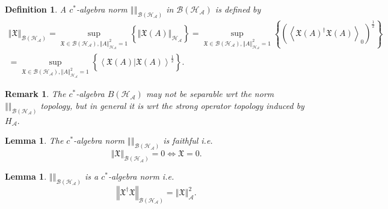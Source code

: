 \documentclass[aps,preprint]{revtex4}%
\newtheorem{definition}[theorem]{Definition}
\newtheorem{lemma}[theorem]{Lemma}
\newtheorem{remark}[theorem]{Remark}
\begin{document}
\begin{definition}
A $c^{\ast}$-algebra norm $\left\Vert {}\right\Vert _{\mathcal{B}\left(
\mathcal{H}_{\mathcal{A}}\right)  }$ in $\mathcal{B}\left(  \mathcal{H}%
_{\mathcal{A}}\right)  $ is defined by
\begin{gather}
\left\Vert \mathfrak{X}\right\Vert _{\mathcal{B}\left(  \mathcal{H}%
_{\mathcal{A}}\right)  }=\sup\limits_{\mathfrak{X}\in\mathcal{B}\left(
\mathcal{H}_{\mathcal{A}}\right)  ,\left\Vert A\right\Vert _{\mathcal{H}%
_{\mathcal{A}}}^{2}=1}\left\{  \left\Vert \mathfrak{X}\left(  A\right)
\right\Vert _{\mathcal{H}_{\mathcal{A}}}\right\}  =\sup\limits_{\mathfrak{X}%
\in\mathcal{B}\left(  \mathcal{H}_{\mathcal{A}}\right)  ,\left\Vert
A\right\Vert _{\mathcal{H}_{\mathcal{A}}}^{2}=1}\left\{  \left(  \left\langle
\mathfrak{X}\left(  A\right)  ^{\dagger}\mathfrak{X}\left(  A\right)
\right\rangle _{0}\right)  ^{\frac{1}{2}}\right\} \\
=\sup\limits_{\mathfrak{X}\in\mathcal{B}\left(  \mathcal{H}_{\mathcal{A}%
}\right)  ,\left\Vert A\right\Vert _{\mathcal{H}_{\mathcal{A}}}^{2}=1}\left\{
\left\langle \left.  \mathfrak{X}\left(  A\right)  \right\vert \mathfrak{X}%
\left(  A\right)  \right\rangle ^{\frac{1}{2}}\right\}  .
\end{gather}

\end{definition}

\begin{remark}
\emph{The }$c^{\ast}$\emph{-algebra }$B\left(  \mathcal{H}_{\mathcal{A}%
}\right)  $\emph{ may not be separable wrt the norm }$\left\Vert {}\right\Vert
_{\mathcal{B}\left(  \mathcal{H}_{\mathcal{A}}\right)  }$\emph{ topology, but
in general it is wrt the strong operator topology induced by }$H_{\mathcal{A}%
}.$
\end{remark}

\begin{lemma}
The $c^{\ast}$-algebra norm $\left\Vert {}\right\Vert _{\mathcal{B}\left(
\mathcal{H}_{\mathcal{A}}\right)  }$ is faithful i.e.
\begin{equation}
\left\Vert \mathfrak{X}\right\Vert _{\mathcal{B}\left(  \mathcal{H}%
_{\mathcal{A}}\right)  }=0\Leftrightarrow\mathfrak{X}=0.
\end{equation}

\end{lemma}

\begin{lemma}
$\left\Vert {}\right\Vert _{\mathcal{B}\left(  \mathcal{H}_{\mathcal{A}%
}\right)  }$ is a $c^{\ast}$-algebra norm i.e.
\begin{equation}
\left\Vert \mathfrak{X}^{\dagger}\mathfrak{X}\right\Vert _{\mathcal{B}\left(
\mathcal{H}_{\mathcal{A}}\right)  }=\left\Vert \mathfrak{X}\right\Vert
_{\mathcal{A}}^{2}.
\end{equation}

\end{lemma}
\end{document}
